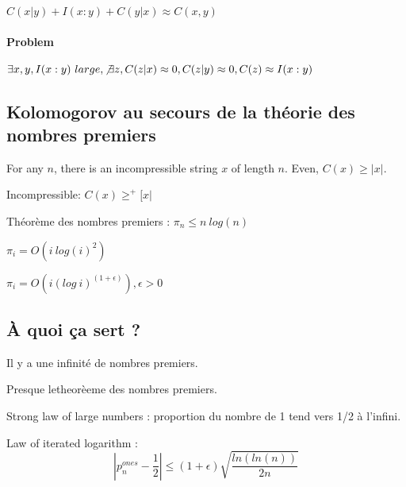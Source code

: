 \begin{theorem}
$C(x|y) + I(x:y)+C(y|x) \approx C(x,y)$
\end{theorem}

\paragraph{Problem}$\exists x,y,I(x:y) ~large, \not\exists z, C(z|x) \approx 0, C(z|y) \approx 0, C(z) \approx I(x:y)$

\subsection{Kolomogorov au secours de la théorie des nombres premiers}

\par For any $n$, there is an incompressible string $x$ of length $n$. Even, $C(x) \geqslant |x|$.

\begin{definition}
Incompressible: $C(x) \geqslant^+ [x|$
\end{definition}

\begin{theorem}
Théorème des nombres premiers : $\pi_n \leqslant n~log(n)$
\end{theorem}

\begin{theorem}
$\pi_i = O(i~log(i)^2)$
\end{theorem}

\begin{theorem}
$\pi_i = O(i(log~i)^{(1+\epsilon)}), \epsilon > 0$
\end{theorem}

\subsection{À quoi ça sert ?}

\begin{theorem}
Il y a une infinité de nombres premiers.
\end{theorem}

\begin{theorem}
Presque letheorèeme des nombres premiers.
\end{theorem}

\begin{theorem}
Strong law of large numbers : proportion du nombre de 1 tend vers 1/2 à l'infini.
\end{theorem}

\begin{theorem}
Law of iterated logarithm :
$$|p_n^{ones}-\frac{1}{2}| \leqslant (1 + \epsilon) \sqrt{\frac{ln (ln(n))}{2n}}$$
\end{theorem}


